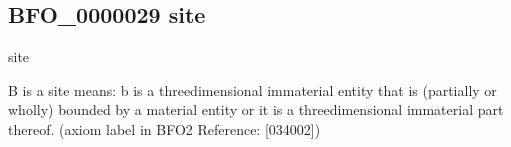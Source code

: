 \documentclass[letterpaper,10pt,english]{sphinxmanual}
\begin{document}
\begin{sphinxShadowBox}

\sphinxAtStartPar
{}
\end{sphinxShadowBox}
\begin{quote}

\ignorespaces \end{quote}


\subsection{BFO\_0000029 \sphinxhyphen{} site}
\label{\detokenize{doc-BFO_0000029:bfo-0000029-site}}\label{\detokenize{doc-BFO_0000029:index-0}}\label{\detokenize{doc-BFO_0000029::doc}}
\begin{sphinxShadowBox}

\sphinxAtStartPar
site
\end{sphinxShadowBox}

\begin{sphinxShadowBox}

\sphinxAtStartPar
{\hyperref[\detokenize{doc-BFO_0000141::doc}]{}}
\end{sphinxShadowBox}

\begin{sphinxShadowBox}

\sphinxAtStartPar
B is a site means: b is a three\sphinxhyphen{}dimensional immaterial entity that is (partially or wholly) bounded by a material entity or it is a three\sphinxhyphen{}dimensional immaterial part thereof. (axiom label in BFO2 Reference: {[}034\sphinxhyphen{}002{]})
\end{sphinxShadowBox}
\end{document}
